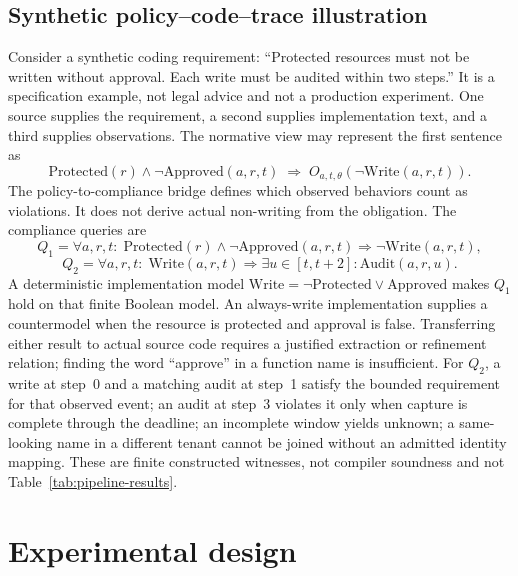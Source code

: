 \documentclass{article}
\begin{document}
\subsection{Synthetic policy--code--trace illustration}
Consider a synthetic coding requirement: ``Protected resources must not be written without approval. Each write must be audited within two steps.'' It is a specification example, not legal advice and not a production experiment. One source supplies the requirement, a second supplies implementation text, and a third supplies observations. The normative view may represent the first sentence as
\begin{equation}
\mathrm{Protected}(r)\land\neg\mathrm{Approved}(a,r,t)\;\Rightarrow\; O_{a,t,\theta}(\neg\mathrm{Write}(a,r,t)).
\label{eq:obl}
\end{equation}
The policy-to-compliance bridge defines which observed behaviors count as violations. It does not derive actual non-writing from the obligation. The compliance queries are
\begin{equation}
Q_1=\forall a,r,t:\;\mathrm{Protected}(r)\land\neg\mathrm{Approved}(a,r,t)\Rightarrow\neg\mathrm{Write}(a,r,t),
\label{eq:q1}
\end{equation}
\begin{equation}
Q_2=\forall a,r,t:\;\mathrm{Write}(a,r,t)\Rightarrow\exists u\in[t,t+2]:\mathrm{Audit}(a,r,u).
\label{eq:q2}
\end{equation}
A deterministic implementation model $\mathrm{Write}=\neg\mathrm{Protected}\lor\mathrm{Approved}$ makes $Q_1$ hold on that finite Boolean model. An always-write implementation supplies a countermodel when the resource is protected and approval is false. Transferring either result to actual source code requires a justified extraction or refinement relation; finding the word ``approve'' in a function name is insufficient. For $Q_2$, a write at step~0 and a matching audit at step~1 satisfy the bounded requirement for that observed event; an audit at step~3 violates it only when capture is complete through the deadline; an incomplete window yields unknown; a same-looking name in a different tenant cannot be joined without an admitted identity mapping. These are finite constructed witnesses, not compiler soundness and not Table~\ref{tab:pipeline-results}.

\section{Experimental design}
\end{document}
